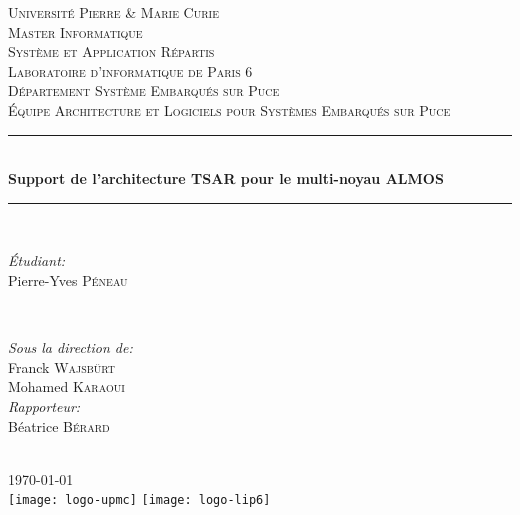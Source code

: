 \begin{titlepage}

\newcommand{\HRule}{\rule{\linewidth}{0.44mm}}
\center


\textsc{\LARGE Université Pierre \& Marie Curie}\\[0.44cm]
\textsc{\Large Master Informatique}\\[0.44cm]
\textsc{\large Système et Application Répartis}\\[1.44cm]

\textsc{\LARGE Laboratoire d'informatique de Paris 6}\\[0.44cm]
\textsc{\Large Département Système Embarqués sur Puce}\\[0.44cm]
\textsc{\large Équipe Architecture et Logiciels pour Systèmes Embarqués sur
  Puce}\\[1.44cm]

\HRule \\[0.4cm] { \huge
  \bfseries Support de l'architecture TSAR pour le multi-noyau ALMOS}\\[0.4cm]
\HRule \\[1.44cm]


\begin{minipage}{0.4\textwidth}
\begin{flushleft} \large
\emph{Étudiant:}\\ Pierre-Yves \textsc{Péneau}
\end{flushleft}
\end{minipage}
~
\begin{minipage}{0.4\textwidth}
\begin{flushright} \large
  \emph{Sous la direction de:} \\ Franck \textsc{Wajsbürt}\\ Mohamed
  \textsc{Karaoui}\\\vspace{1.44cm} \emph{Rapporteur:} \\ Béatrice
  \textsc{Bérard}
\end{flushright}
\end{minipage}\\[2cm]


{\large \today}\\[1cm]


\texttt{[image: logo-upmc]}\hspace{3cm}
\texttt{[image: logo-lip6]}\\[1cm]
\vfill

\end{titlepage}
